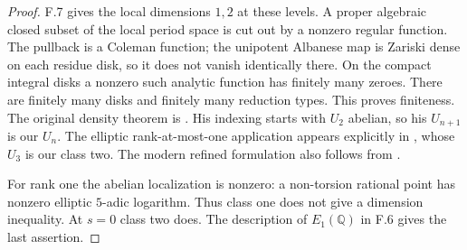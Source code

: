 \begin{proof}
F.7 gives the local dimensions $1,2$ at these levels. A proper
algebraic closed subset of the local period space is cut out by a
nonzero regular function. The pullback is a Coleman function; the
unipotent Albanese map is Zariski dense on each residue disk, so it
does not vanish identically there. On the compact integral disks a
nonzero such analytic function has finitely many zeroes. There are
finitely many disks and finitely many reduction types. This proves
finiteness. The original density theorem is
\citet[Theorem 1, p.~93; finiteness deduction in \S3]{FE_Kim2009}.
His indexing starts with $U_2$ abelian, so his $U_{n+1}$ is our $U_n$.
The elliptic rank-at-most-one application appears explicitly in
\citet[Corollary 0.3 and its proof in \S2]{FE_KimTamagawa2008}, whose
$U_3$ is our class two. The modern refined formulation also follows
from \citet[Theorem A, Remark 1.4, and Lemma 3.2]{FE_LLM2023}.

For rank one the abelian localization is nonzero: a non-torsion
rational point has nonzero elliptic $5$-adic logarithm. Thus class one
does not give a dimension inequality. At $s=0$ class two does. The
description of $E_1(\mathbb Q)$ in F.6 gives the last assertion.
\end{proof}

